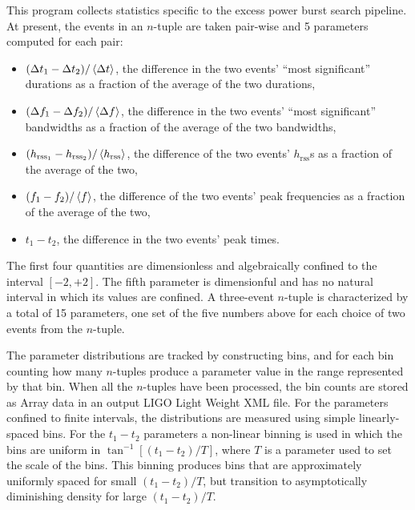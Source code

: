 \documentclass[10pt]{article}
\begin{document}
This program collects statistics specific to the excess power burst search
pipeline.  At present, the events in an \(n\)-tuple are taken pair-wise and
5 parameters computed for each pair:
\begin{itemize}
\item \((\Delta t_{1} - \Delta t_{2}) / \left\langle\Delta t\right\rangle\), the difference
in the two events' ``most significant'' durations as a fraction of the
average of the two durations,

\item \((\Delta f_{1} - \Delta f_{2}) / \left\langle\Delta f\right\rangle\), the difference
in the two events' ``most significant'' bandwidths as a fraction of the
average of the two bandwidths,

\item \((h_{\text{rss}_{1}} - h_{\text{rss}_{2}}) /
\left\langle h_{\text{rss}}\right\rangle\), the difference of the two events'
\(h_{\text{rss}}\)s as a fraction of the average of the two,

\item \((f_{1} - f_{2}) / \left\langle f\right\rangle\), the difference of the two events'
peak frequencies as a fraction of the average of the two,

\item \(t_{1} - t_{2}\), the difference in the two events' peak times.

\end{itemize}
The first four quantities are dimensionless and algebraically confined to
the interval \([-2, +2]\).  The fifth parameter is dimensionful and has no
natural interval in which its values are confined.  A three-event
\(n\)-tuple is characterized by a total of 15 parameters, one set of the
five numbers above for each choice of two events from the \(n\)-tuple.

The parameter distributions are tracked by constructing bins, and for each
bin counting how many \(n\)-tuples produce a parameter value in the range
represented by that bin.  When all the \(n\)-tuples have been processed,
the bin counts are stored as Array data in an output LIGO Light Weight XML
file.  For the parameters confined to finite intervals, the distributions
are measured using simple linearly-spaced bins.  For the \(t_{1} - t_{2}\)
parameters a non-linear binning is used in which the bins are uniform in
\(\tan^{-1} [(t_{1} - t_{2}) / T]\), where \(T\) is a parameter used to set
the scale of the bins.  This binning produces bins that are approximately
uniformly spaced for small \((t_{1} - t_{2}) / T\), but transition to
asymptotically diminishing density for large \((t_{1} - t_{2}) / T\).
\end{document}
